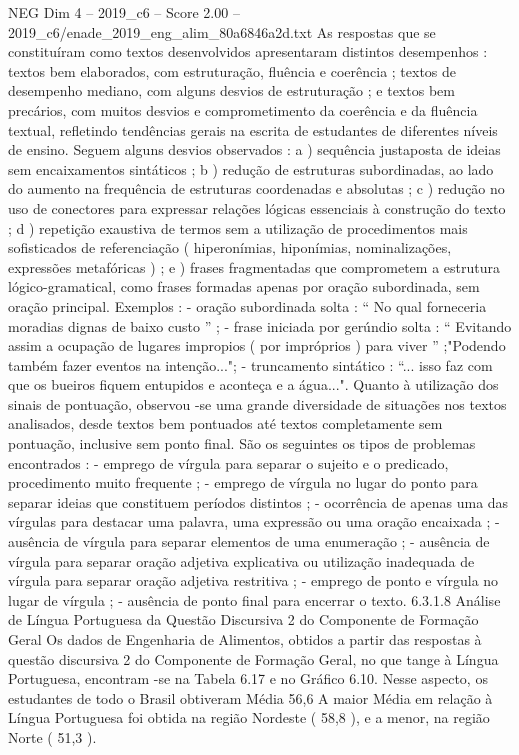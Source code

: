 \begin{textsample}{NEG Dim 4 – 2019\_c6 – Score 2.00 – 2019\_c6/enade\_2019\_eng\_alim\_80a6846a2d.txt}
As respostas que se constituíram como textos desenvolvidos apresentaram distintos desempenhos : textos bem elaborados, com estruturação, fluência e coerência ; textos de desempenho mediano, com alguns desvios de estruturação ; e textos bem precários, com muitos desvios e comprometimento da coerência e da fluência textual, refletindo tendências gerais na escrita de estudantes de diferentes níveis de ensino.
Seguem alguns desvios observados : a ) sequência justaposta de ideias sem encaixamentos sintáticos ; b ) redução de estruturas subordinadas, ao lado do aumento na frequência de estruturas coordenadas e absolutas ; c ) redução no uso de conectores para expressar relações lógicas essenciais à construção do texto ; d ) repetição exaustiva de termos sem a utilização de procedimentos mais sofisticados de referenciação ( hiperonímias, hiponímias, nominalizações, expressões metafóricas ) ; e ) frases fragmentadas que comprometem a estrutura lógico-gramatical, como frases formadas apenas por oração subordinada, sem oração principal.
Exemplos : - oração subordinada solta : “ No qual forneceria moradias dignas de baixo custo ” ; - frase iniciada por gerúndio solta : “ Evitando assim a ocupação de lugares impropios ( por impróprios ) para viver ” ;"Podendo também fazer eventos na intenção..."; - truncamento sintático : “... isso faz com que os bueiros fiquem entupidos e aconteça e a água...".
Quanto à utilização dos sinais de pontuação, observou -se uma grande diversidade de situações nos textos analisados, desde textos bem pontuados até textos completamente sem pontuação, inclusive sem ponto final.
São os seguintes os tipos de problemas encontrados : - emprego de vírgula para separar o sujeito e o predicado, procedimento muito frequente ; - emprego de vírgula no lugar do ponto para separar ideias que constituem períodos distintos ; - ocorrência de apenas uma das vírgulas para destacar uma palavra, uma expressão ou uma oração encaixada ; - ausência de vírgula para separar elementos de uma enumeração ; - ausência de vírgula para separar oração adjetiva explicativa ou utilização inadequada de vírgula para separar oração adjetiva restritiva ; - emprego de ponto e vírgula no lugar de vírgula ; - ausência de ponto final para encerrar o texto. 6.3.1.8 Análise de Língua Portuguesa da Questão Discursiva 2 do Componente de Formação Geral Os dados de Engenharia de Alimentos, obtidos a partir das respostas à questão discursiva 2 do Componente de Formação Geral, no que tange à Língua Portuguesa, encontram -se na Tabela 6.17 e no Gráfico 6.10.
Nesse aspecto, os estudantes de todo o Brasil obtiveram Média 56,6 A maior Média em relação à Língua Portuguesa foi obtida na região Nordeste ( 58,8 ), e a menor, na região Norte ( 51,3 ).

\end{textsample}
